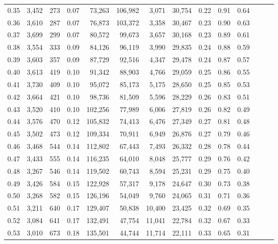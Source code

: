\begin{tabular}{rrrrrrrrrrrrrr}
0.35 &  3,452 &  273 &  0.07 &   73,263 &  106,982 &   3,071 &  30,754 &  0.22 &  0.91 &      0.64 \\
0.36 &  3,610 &  287 &  0.07 &   76,873 &  103,372 &   3,358 &  30,467 &  0.23 &  0.90 &      0.63 \\
0.37 &  3,699 &  299 &  0.07 &   80,572 &   99,673 &   3,657 &  30,168 &  0.23 &  0.89 &      0.61 \\
0.38 &  3,554 &  333 &  0.09 &   84,126 &   96,119 &   3,990 &  29,835 &  0.24 &  0.88 &      0.59 \\
0.39 &  3,603 &  357 &  0.09 &   87,729 &   92,516 &   4,347 &  29,478 &  0.24 &  0.87 &      0.57 \\
0.40 &  3,613 &  419 &  0.10 &   91,342 &   88,903 &   4,766 &  29,059 &  0.25 &  0.86 &      0.55 \\
0.41 &  3,730 &  409 &  0.10 &   95,072 &   85,173 &   5,175 &  28,650 &  0.25 &  0.85 &      0.53 \\
0.42 &  3,664 &  421 &  0.10 &   98,736 &   81,509 &   5,596 &  28,229 &  0.26 &  0.83 &      0.51 \\
0.43 &  3,520 &  410 &  0.10 &  102,256 &   77,989 &   6,006 &  27,819 &  0.26 &  0.82 &      0.49 \\
0.44 &  3,576 &  470 &  0.12 &  105,832 &   74,413 &   6,476 &  27,349 &  0.27 &  0.81 &      0.48 \\
0.45 &  3,502 &  473 &  0.12 &  109,334 &   70,911 &   6,949 &  26,876 &  0.27 &  0.79 &      0.46 \\
0.46 &  3,468 &  544 &  0.14 &  112,802 &   67,443 &   7,493 &  26,332 &  0.28 &  0.78 &      0.44 \\
0.47 &  3,433 &  555 &  0.14 &  116,235 &   64,010 &   8,048 &  25,777 &  0.29 &  0.76 &      0.42 \\
0.48 &  3,267 &  546 &  0.14 &  119,502 &   60,743 &   8,594 &  25,231 &  0.29 &  0.75 &      0.40 \\
0.49 &  3,426 &  584 &  0.15 &  122,928 &   57,317 &   9,178 &  24,647 &  0.30 &  0.73 &      0.38 \\
0.50 &  3,268 &  582 &  0.15 &  126,196 &   54,049 &   9,760 &  24,065 &  0.31 &  0.71 &      0.36 \\
0.51 &  3,211 &  640 &  0.17 &  129,407 &   50,838 &  10,400 &  23,425 &  0.32 &  0.69 &      0.35 \\
0.52 &  3,084 &  641 &  0.17 &  132,491 &   47,754 &  11,041 &  22,784 &  0.32 &  0.67 &      0.33 \\
0.53 &  3,010 &  673 &  0.18 &  135,501 &   44,744 &  11,714 &  22,111 &  0.33 &  0.65 &      0.31 \\

\end{tabular}
